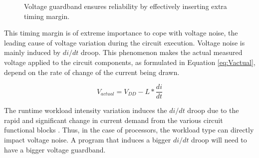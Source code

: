 \begin{figure}[!htb]
  \begin{subfigmatrix}{2}
  \end{subfigmatrix}
  \caption{Voltage guardband ensures reliability by effectively inserting extra timing margin.}
  \label{fig:timming_guardband}
\end{figure}

This timing margin is of extreme importance to cope with voltage noise, the leading cause of voltage variation during the circuit execution. Voltage noise is mainly induced by $di/dt$ droop. This phenomenon makes the actual measured voltage applied to the circuit components, as formulated in Equation \ref{eq:Vactual}, depend on the rate of change of the current being drawn. 

\begin{equation}
    \label{eq:Vactual}
    V_{actual} = V_{DD}-L*\frac{di}{dt}
\end{equation}

The runtime workload intensity variation induces the $di/dt$ droop due to the rapid and significant change in current demand from the various circuit functional blocks \cite{thomas_core_2016}. Thus, in the case of processors, the workload type can directly impact voltage noise. A program that induces a bigger $di/dt$ droop will need to have a bigger voltage guardband.

